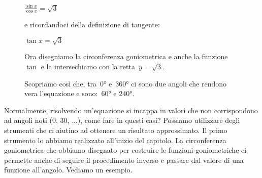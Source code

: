 \begin{exrig}
\begin{esempio}
\begin{figure}[!h]
\begin{minipage}{.48\textwidth}
  $\frac{\sin x}{\cos x} = \sqrt{3}$
  
  e ricordandoci della definizione di tangente:

  $\tan x = \sqrt{3}$
  
  Ora disegniamo la circonferenza goniometrica e anche la funzione~$\tan$ 
  e la intersechiamo con la retta~$y=\sqrt{3}$.
  
  Scopriamo così che, tra~0° e~360° ci sono due angoli che rendono vera 
  l'equazione e sono:~60° e 240°. 
 \end{minipage}
\end{figure}
 \end{esempio}

\end{exrig}

 Normalmente, risolvendo un'equazione si incappa in valori che non 
 corrispondono ad angoli noti (0\grado, 30\grado, ...), come fare in questi 
 casi? Possiamo utilizzare degli strumenti che ci aiutino ad ottenere un 
 risultato approssimato. Il primo strumento lo abbiamo realizzato all'inizio 
 del capitolo. La circonferenza goniometrica che abbiamo disegnato per 
 costruire le funzioni goniometriche ci permette anche di seguire il 
 procedimento inverso e passare dal valore di una funzione all'angolo. 
 Vediamo un esempio.
 
